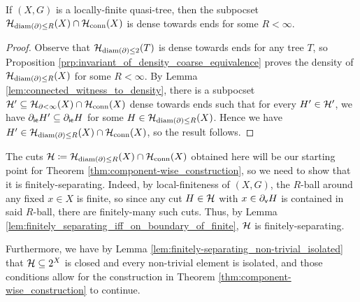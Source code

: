 \documentclass[reqno]{amsart}
\begin{document}
    \begin{corollary}\label{cor:density_of_bounded_diameter_boundary_cuts_quasi_tree}
        If $(X,G)$ is a locally-finite quasi-tree, then the subpocset $\mathcal{H}_{\operatorname{diam}(\partial)\leq R}(X)\cap\mathcal{H}_\mathrm{conn}(X)$ is dense towards ends for some $R<\infty$.
    \end{corollary}
    \begin{proof}
        Observe that $\mathcal{H}_{\operatorname{diam}(\partial)\leq2}(T)$ is dense towards ends for any tree $T$, so Proposition \ref{prp:invariant_of_density_coarse_equivalence} proves the density of $\mathcal{H}_{\operatorname{diam}(\partial)\leq R}(X)$ for some $R<\infty$. By Lemma \ref{lem:connected_witness_to_density}, there is a subpocset $\mathcal{H}'\subseteq\mathcal{H}_{\partial<\infty}(X)\cap\mathcal{H}_\mathrm{conn}(X)$ dense towards ends such that for every $H'\in\mathcal{H}'$, we have $\partial_\mathsf{ie}H'\subseteq\partial_\mathsf{ie}H$ for some $H\in\mathcal{H}_{\operatorname{diam}(\partial)\leq R}(X)$. Hence we have $H'\in\mathcal{H}_{\operatorname{diam}(\partial)\leq R}(X)\cap\mathcal{H}_\mathrm{conn}(X)$, so the result follows.
    \end{proof}

    The cuts $\mathcal{H}\coloneqq\mathcal{H}_{\operatorname{diam}(\partial)\leq R}(X)\cap\mathcal{H}_\mathrm{conn}(X)$ obtained here will be our starting point for Theorem \ref{thm:component-wise_construction}, so we need to show that it is finitely-separating. Indeed, by local-finiteness of $(X,G)$, the $R$-ball around any fixed $x\in X$ is finite, so since any cut $H\in\mathcal{H}$ with $x\in\partial_\mathsf{v}H$ is contained in said $R$-ball, there are finitely-many such cuts. Thus, by Lemma \ref{lem:finitely_separating_iff_on_boundary_of_finite}, $\mathcal{H}$ is finitely-separating.

    Furthermore, we have by Lemma \ref{lem:finitely-separating_non-trivial_isolated} that $\mathcal{H}\subseteq2^X$ is closed and every non-trivial element is isolated, and those conditions allow for the construction in Theorem \ref{thm:component-wise_construction} to continue.


\end{document}
